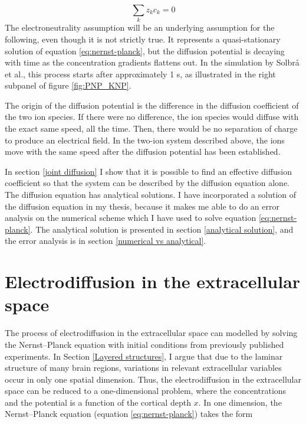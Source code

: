 \documentclass{uiophd}
\begin{document}
$$\sum _k z_k c_k =0$$
The electroneutrality assumption will be an underlying assumption for the following, even though it is not strictly true. It represents a quasi-stationary solution of equation \ref{eq:nernst-planck}, but the diffusion potential is decaying with time as the concentration gradients flattens out. In the simulation by Solbr{\aa} et al., this process starts after approximately 1 s, as illustrated in the right subpanel of figure \ref{fig:PNP_KNP}. 



The origin of the diffusion potential is the difference in the diffusion coefficient of the two ion species. If there were no difference, the ion species would diffuse with the exact same speed, all the time. Then, there would be no separation of charge to produce an electrical field. In the two-ion system described above, the ions move with the same speed after the diffusion potential has been established. 

In section \ref{joint diffusion} I show that  it is possible to find an effective diffusion coefficient so that the system can be described by the diffusion equation alone. 
The diffusion equation has analytical solutions. I have incorporated a solution of the diffusion equation in my thesis, because it makes me able to do an error analysis on the numerical scheme which I have used to solve equation \ref{eq:nernst-planck}. The analytical solution is presented in section \ref{analytical solution}, and the error analysis is in section \ref{numerical vs analytical}.


\section{Electrodiffusion in the extracellular space}\label{el.diff in ES}


The process of electrodiffusion in the extracellular space can modelled by solving the Nernst--Planck equation with initial conditions from previously published experiments. In Section \ref{Layered structures}, I argue that due to the laminar structure of many brain regions, variations in relevant extracellular variables occur in only one spatial dimension. Thus, the electrodiffusion in the extracellular space can be reduced to a one-dimensional problem, where the concentrations and the potential is a function of the cortical depth $x$. In one dimension, the Nernst--Planck equation (equation \ref{eq:nernst-planck}) takes the form 
\end{document}
